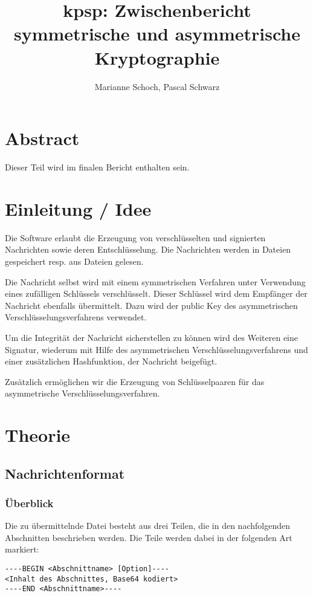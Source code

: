 \documentclass[11pt,a4paper,parskip=half]{scrartcl}
\title{kpsp: Zwischenbericht symmetrische und asymmetrische Kryptographie}
\author{Marianne Schoch, Pascal Schwarz}
\begin{document}
\maketitle

\section{Abstract}
Dieser Teil wird im finalen Bericht enthalten sein.

\section{Einleitung / Idee}
Die Software erlaubt die Erzeugung von verschlüsselten und signierten Nachrichten sowie deren Entschlüsselung. Die Nachrichten werden in Dateien gespeichert resp. aus Dateien gelesen.

Die Nachricht selbst wird mit einem symmetrischen Verfahren unter Verwendung eines zufälligen Schlüssels verschlüsselt. Dieser Schlüssel wird dem Empfänger der Nachricht ebenfalls übermittelt. Dazu wird der public Key des asymmetrischen Verschlüsselungsverfahrens verwendet.

Um die Integrität der Nachricht sicherstellen zu können wird des Weiteren eine Signatur, wiederum mit Hilfe des asymmetrischen Verschlüsselungsverfahrens und einer zusätzlichen Hashfunktion, der Nachricht beigefügt.

Zusätzlich ermöglichen wir die Erzeugung von Schlüsselpaaren für das asymmetrische Verschlüsselungsverfahren.

\section{Theorie}
\subsection{Nachrichtenformat}
\subsubsection{Überblick}
Die zu übermittelnde Datei besteht aus drei Teilen, die in den nachfolgenden Abschnitten beschrieben werden. Die Teile werden dabei in der folgenden Art markiert:
\begin{lstlisting}
----BEGIN <Abschnittname> [Option]----
<Inhalt des Abschnittes, Base64 kodiert>
----END <Abschnittname>----
\end{lstlisting}
\end{document}
